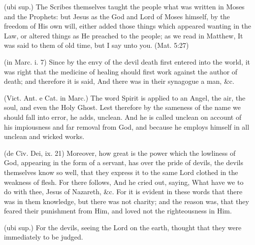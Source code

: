  (ubi sup.) The Scribes themselves taught the people what was written in Moses and the Prophets: but Jesus as the God and Lord of Moses himself, by the freedom of His own will, either added those things which appeared wanting in the Law, or altered things as He preached to the people; as we read in Matthew, It was said to them of old time, but I say unto you. (Mat. 5:27)

 

 (in Marc. i. 7) Since by the envy of the devil death first entered into the world, it was right that the medicine of healing should first work against the author of death; and therefore it is said, And there was in their synagogue a man, \&c.

 (Vict. Ant. e Cat. in Marc.) The word Spirit is applied to an Angel, the air, the soul, and even the Holy Ghost. Lest therefore by the sameness of the name we should fall into error, he adds, unclean. And he is called unclean on account of his impiousness and far removal from God, and because he employs himself in all unclean and wicked works.

 (de Civ. Dei, ix. 21) Moreover, how great is the power which the lowliness of God, appearing in the form of a servant, has over the pride of devils, the devils themselves know so well, that they express it to the same Lord clothed in the weakness of flesh. For there follows, And he cried out, saying, What have we to do with thee, Jesus of Nazareth, \&c. For it is evident in these words that there was in them knowledge, but there was not charity; and the reason was, that they feared their punishment from Him, and loved not the righteousness in Him.

 (ubi sup.) For the devils, seeing the Lord on the earth, thought that they were immediately to be judged.

